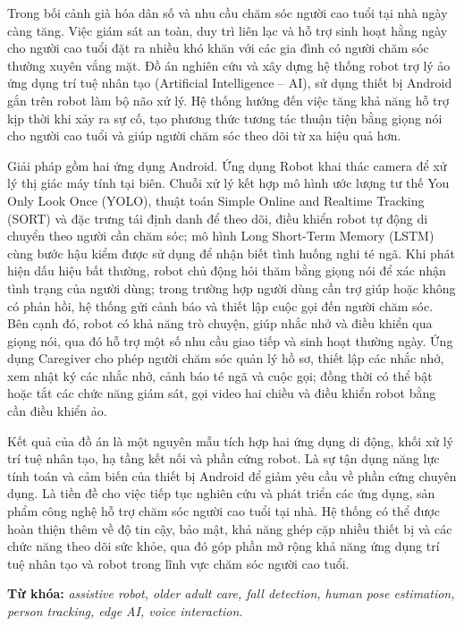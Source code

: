 
Trong bối cảnh già hóa dân số và nhu cầu chăm sóc người cao tuổi tại nhà ngày càng tăng. Việc giám sát an toàn, duy trì liên lạc và hỗ trợ sinh hoạt hằng ngày cho người cao tuổi đặt ra nhiều khó khăn với các gia đình có người chăm sóc thường xuyên vắng mặt. Đồ án nghiên cứu và xây dựng hệ thống robot trợ lý ảo ứng dụng trí tuệ nhân tạo (Artificial Intelligence -- AI), sử dụng thiết bị Android gắn trên robot làm bộ não xử lý. Hệ thống hướng đến việc tăng khả năng hỗ trợ kịp thời khi xảy ra sự cố, tạo phương thức tương tác thuận tiện bằng giọng nói cho người cao tuổi và giúp người chăm sóc theo dõi từ xa hiệu quả hơn.

Giải pháp gồm hai ứng dụng Android. Ứng dụng Robot khai thác camera để xử lý thị giác máy tính tại biên. Chuỗi xử lý kết hợp mô hình ước lượng tư thế You Only Look Once (YOLO), thuật toán Simple Online and Realtime Tracking (SORT) và đặc trưng tái định danh để theo dõi, điều khiển robot tự động di chuyển theo người cần chăm sóc; mô hình Long Short-Term Memory (LSTM) cùng bước hậu kiểm được sử dụng để nhận biết tình huống nghi té ngã. Khi phát hiện dấu hiệu bất thường, robot chủ động hỏi thăm bằng giọng nói để xác nhận tình trạng của người dùng; trong trường hợp người dùng cần trợ giúp hoặc không có phản hồi, hệ thống gửi cảnh báo và thiết lập cuộc gọi đến người chăm sóc. Bên cạnh đó, robot có khả năng trò chuyện, giúp nhắc nhở và điều khiển qua giọng nói, qua đó hỗ trợ một số nhu cầu giao tiếp và sinh hoạt thường ngày. Ứng dụng Caregiver cho phép người chăm sóc quản lý hồ sơ, thiết lập các nhắc nhở, xem nhật ký các nhắc nhở, cảnh báo té ngã và cuộc gọi; đồng thời có thể bật hoặc tắt các chức năng giám sát, gọi video hai chiều và điều khiển robot bằng cần điều khiển ảo. 

Kết quả của đồ án là một nguyên mẫu tích hợp hai ứng dụng di động, khối xử lý trí tuệ nhân tạo, hạ tầng kết nối và phần cứng robot. Là sự tận dụng năng lực tính toán và cảm biến của thiết bị Android để giảm yêu cầu về phần cứng chuyên dụng. Là tiền đề cho việc tiếp tục nghiên cứu và phát triển các ứng dụng, sản phẩm công nghệ hỗ trợ chăm sóc người cao tuổi tại nhà. Hệ thống có thể được hoàn thiện thêm về độ tin cậy, bảo mật, khả năng ghép cặp nhiều thiết bị và các chức năng theo dõi sức khỏe, qua đó góp phần mở rộng khả năng ứng dụng trí tuệ nhân tạo và robot trong lĩnh vực chăm sóc người cao tuổi.

\noindent\textbf{Từ khóa:} \textit{assistive robot, older adult care, fall detection, human pose estimation, person tracking, edge AI, voice interaction.}
